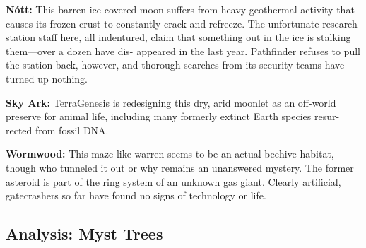 \textbf{Nótt:} This barren ice-covered moon suffers from 
heavy geothermal activity that causes its frozen crust to 
constantly crack and refreeze. The unfortunate research 
station staff here, all indentured, claim that something 
out in the ice is stalking them—over a dozen have dis-
appeared in the last year. Pathfinder refuses to pull the 
station back, however, and thorough searches from its 
security teams have turned up nothing.

\textbf{Sky Ark:} TerraGenesis is redesigning this dry, arid 
moonlet as an off-world preserve for animal life, 
including many formerly extinct Earth species resur-
rected from fossil DNA.

\textbf{Wormwood:} This maze-like warren seems to be an 
actual beehive habitat, though who tunneled it out 
or why remains an unanswered mystery. The former 
asteroid is part of the ring system of an unknown gas 
giant. Clearly artificial, gatecrashers so far have found 
no signs of technology or life.

\subsection{Analysis: Myst Trees}

